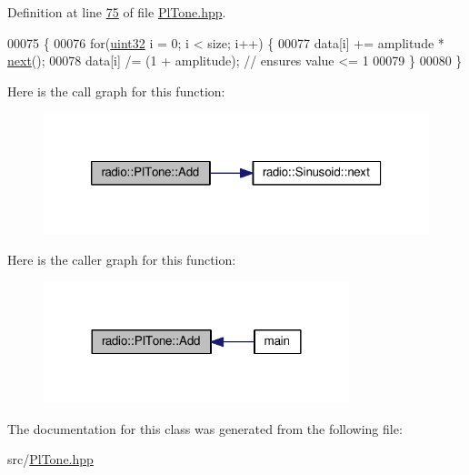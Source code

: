 Definition at line \hyperlink{PlTone_8hpp_source_l00075}{75} of file \hyperlink{PlTone_8hpp_source}{Pl\+Tone.\+hpp}.


\begin{DoxyCode}
00075                      \{
00076         \textcolor{keywordflow}{for}(\hyperlink{definitions_8hpp_a1134b580f8da4de94ca6b1de4d37975e}{uint32} i = 0; i < size; i++) \{
00077             data[i] += amplitude * \hyperlink{classradio_1_1Sinusoid_aab44298ea1bd5cb175d5826243cf56f2}{next}();
00078             data[i] /= (1 + amplitude);  \textcolor{comment}{// ensures value <= 1}
00079         \}
00080     \}
\end{DoxyCode}


Here is the call graph for this function\+:
\nopagebreak
\begin{figure}[H]
\begin{center}
\leavevmode
\includegraphics[width=320pt]{classradio_1_1PlTone_a9e19b2d5106b35626d4839f04f9b9f95_cgraph}
\end{center}
\end{figure}




Here is the caller graph for this function\+:
\nopagebreak
\begin{figure}[H]
\begin{center}
\leavevmode
\includegraphics[width=252pt]{classradio_1_1PlTone_a9e19b2d5106b35626d4839f04f9b9f95_icgraph}
\end{center}
\end{figure}




The documentation for this class was generated from the following file\+:\begin{DoxyCompactItemize}
\item 
src/\hyperlink{PlTone_8hpp}{Pl\+Tone.\+hpp}\end{DoxyCompactItemize}
